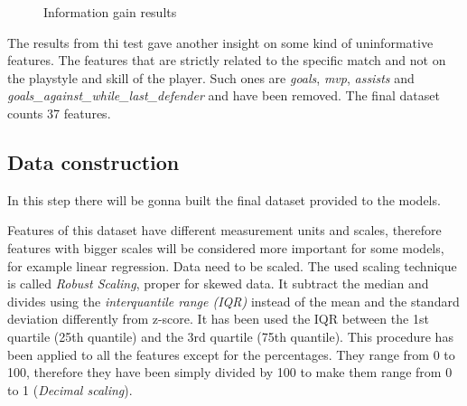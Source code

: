 \begin{figure}[H]
    \label{fig:ig}
    \caption{Information gain results}
\end{figure}

The results from thi test gave another insight on some kind of uninformative features. The features that are strictly related to the specific match and not on the playstyle and skill of the player. Such ones are \textit{goals}, \textit{mvp}, \textit{assists} and \textit{goals\_against\_while\_last\_defender} and have been removed. The final dataset counts 37 features.

\subsection{Data construction}

In this step there will be gonna built the final dataset provided to the models.

Features of this dataset have different measurement units and scales, therefore features with bigger scales will be considered more important for some models, for example linear regression. Data need to be scaled.
The used scaling technique is called \textit{Robust Scaling}, proper for skewed data. It subtract the median and divides using the \textit{interquantile range (IQR)} instead of the mean and the standard deviation differently from z-score. It has been used the IQR between the 1st quartile (25th quantile) and the 3rd quartile (75th quantile).
This procedure has been applied to all the features except for the percentages.
They range from 0 to 100, therefore they have been simply divided by 100 to make them range from 0 to 1 (\textit{Decimal scaling}). 

